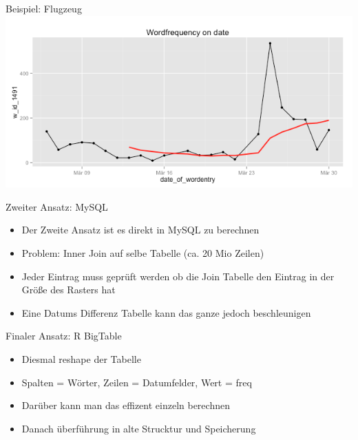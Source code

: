 \documentclass{beamer}
\begin{document}
\begin{frame}{Beispiel: Flugzeug}
\includegraphics[scale=0.5]{Bilder/R2.png}
\end{frame}

\begin{frame}{Zweiter Ansatz: MySQL}
	\begin{itemize}
		\item Der Zweite Ansatz ist es direkt in MySQL zu berechnen
		\item Problem: Inner Join auf selbe Tabelle (ca. 20 Mio Zeilen)
		\item Jeder Eintrag muss geprüft werden ob die Join Tabelle den Eintrag in der Größe des Rasters hat
		\item Eine Datums Differenz Tabelle kann das ganze jedoch beschleunigen

	\end{itemize}
\end{frame}

\begin{frame}{Finaler Ansatz: R BigTable}
	\begin{itemize}
		\item Diesmal reshape der Tabelle
		\item Spalten = Wörter, Zeilen = Datumfelder, Wert = freq
		\item Darüber kann man das effizent einzeln berechnen
		\item Danach überführung in alte Strucktur und Speicherung
	\end{itemize}

\end{frame}
\end{document}
